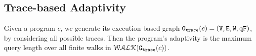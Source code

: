 %
\subsection{Trace-based Adaptivity}
Given a program $c$, we generate its execution-based graph 
$\mathtt{{G_{trace}}}({c}) = (\mathtt{V}, \mathtt{E}, \mathtt{W}, \mathtt{qF})$, by considering all possible traces.
%
Then the program's adaptivity is the maximum query length over all finite walks in $\mathcal{WALK}(\mathtt{{G_{trace}}}({c}))$.
